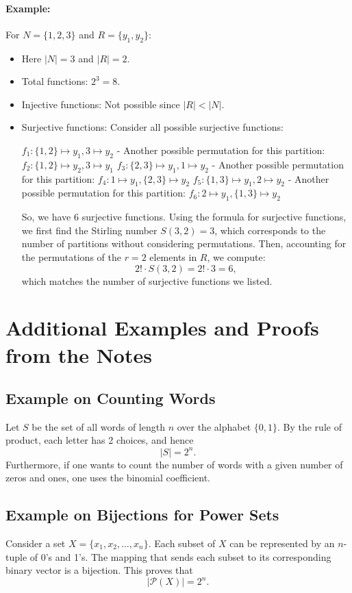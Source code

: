 \documentclass{article}
\begin{document}
\paragraph{Example:}  
For \( N = \{1, 2, 3\} \) and \( R = \{y_1, y_2\} \):
\begin{itemize}[nosep]
    \item[] Here \( |N| = 3 \) and \( |R| = 2 \).
    \item Total functions: $2^3 = 8$.
    \item Injective functions: Not possible since $|R|<|N|$.
    \item Surjective functions: Consider all possible surjective functions:

 \( f_1: \{1, 2\} \mapsto y_1, 3 \mapsto y_2 \)
- Another possible permutation for this partition: \( f_2: \{1, 2\} \mapsto y_2, 3 \mapsto y_1 \)
 \( f_3: \{2, 3\} \mapsto y_1, 1 \mapsto y_2 \)
- Another possible permutation for this partition: \( f_4: 1 \mapsto y_1, \{2, 3\} \mapsto y_2 \)
 \( f_5: \{1, 3\} \mapsto y_1, 2 \mapsto y_2 \)
- Another possible permutation for this partition: \( f_6: 2 \mapsto y_1, \{1, 3\} \mapsto y_2 \)

So, we have 6 surjective functions. Using the formula for surjective functions, we first find the Stirling number \( S(3, 2) = 3 \), which corresponds to the number of partitions without considering permutations. Then, accounting for the permutations of the \( r = 2 \) elements in \( R \), we compute:
\[
2! \cdot S(3, 2) = 2! \cdot 3 = 6,
\]
which matches the number of surjective functions we listed.
\end{itemize}

\section*{Additional Examples and Proofs from the Notes}

\subsection*{Example on Counting Words}
Let $S$ be the set of all words of length $n$ over the alphabet $\{0,1\}$. By the rule of product, each letter has 2 choices, and hence
\[
|S| = 2^n.
\]
Furthermore, if one wants to count the number of words with a given number of zeros and ones, one uses the binomial coefficient.

\subsection*{Example on Bijections for Power Sets}
Consider a set $X = \{x_1, x_2, \dots, x_n\}$. Each subset of $X$ can be represented by an $n$-tuple of 0's and 1's. The mapping that sends each subset to its corresponding binary vector is a bijection. This proves that
\[
|\mathcal{P}(X)| = 2^n.
\]
\end{document}
